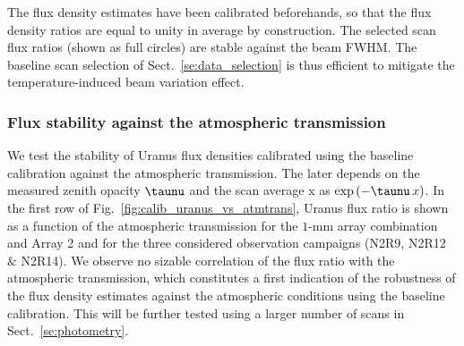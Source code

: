 The flux density estimates have been calibrated beforehands, so that
the flux density ratios are equal to unity in average by construction.
The selected scan flux ratios (shown as full circles) are stable
against the beam FWHM. The baseline scan selection of
Sect.~\ref{se:data_selection} is thus efficient to mitigate the
temperature-induced beam variation effect.


\subsubsection{Flux stability against the atmospheric transmission}
\label{se:baseline_calibration_atm}

We test the stability of Uranus flux densities calibrated using the
baseline calibration against the atmospheric transmission. The later
depends on the measured zenith opacity $\taunu$ and the scan
average \airmass x as $\exp{(-\taunu \, x)}$. In
the first row of Fig.~\ref{fig:calib_uranus_vs_atmtrans}, Uranus flux ratio
is shown as a function of the atmospheric
transmission for the $1$-mm array combination and Array 2 and for the
three considered observation campaigns (N2R9, N2R12 $\&$ N2R14). We
observe no sizable correlation of the flux ratio with the atmospheric
transmission, which constitutes a first
indication of the robustness of the flux density estimates against the
atmospheric conditions using the baseline calibration. This will be
further tested using a larger number of scans in Sect.~\ref{se:photometry}.
%
